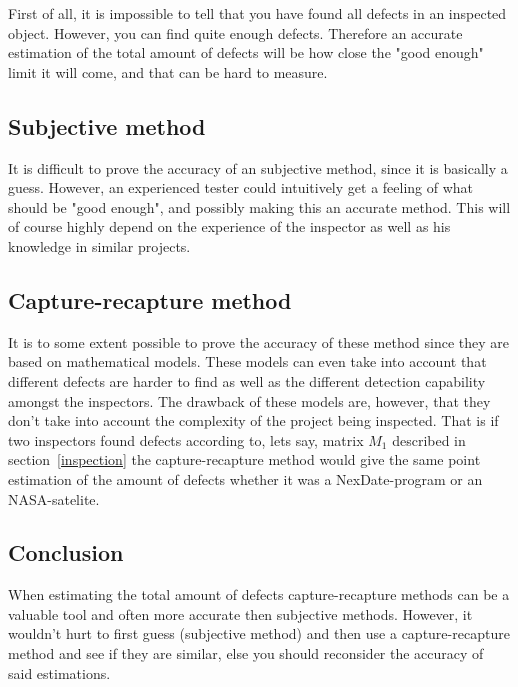 First of all, it is impossible to tell that you have found all defects in an inspected object. However, you can find quite enough defects. 
Therefore an accurate estimation of the total amount of defects will be how close the "good enough" limit it will come, and that can be hard to measure.

\subsection{Subjective method}
It is difficult to prove the accuracy of an subjective method, since it is basically a guess. However, an experienced tester could intuitively get a feeling of what should be "good enough", and possibly making this an accurate method. 
This will of course highly depend on the experience of the inspector as well as his knowledge in similar projects.

\subsection{Capture-recapture method}
It is to some extent possible to prove the accuracy of these method since they are based on mathematical models. These models can even take into account that different defects are harder to find as well as the different detection capability amongst the inspectors. The drawback of these models are, however, that they don't take into account the complexity of the project being inspected. That is if two inspectors found defects according to, lets say, matrix $M_{1}$ described in section~\ref{inspection} the capture-recapture method would give the same point estimation of the amount of defects whether it was a NexDate-program or an NASA-satelite.

\subsection{Conclusion}
When estimating the total amount of defects capture-recapture methods can be a valuable tool and often more accurate then subjective methods. However, it wouldn't hurt to first guess (subjective method) and then use a capture-recapture method and see if they are similar, else you should reconsider the accuracy of said estimations.